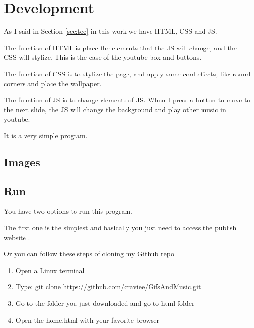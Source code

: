 \section{Development} %

As I said in Section \ref{sec:tec} in this work we have HTML, CSS and JS.

The function of HTML is place the elements that the JS will change, and the CSS will stylize. This is the case of the youtube box and buttons.

The function of CSS is to stylize the page, and apply some cool effects, like round corners and place the wallpaper.

The function of JS is to change elements of JS. When I press a button to move to the next slide, the JS will change the background and play other music in youtube.

It is a very simple program.


\subsection{Images} %

\subsection{Run}

You have two options to run this program.

The first one is the simplest and basically you just need to access the publish website \cite{heroku}.

Or you can follow these steps of cloning my Github repo \cite{craviee}
\begin{enumerate}

	\item Open a Linux terminal
	
	\item Type: git clone https://github.com/craviee/GifsAndMusic.git
	
	\item Go to the folder you just downloaded and go to html folder
	
	\item Open the home.html with your favorite browser
	
\end{enumerate}







